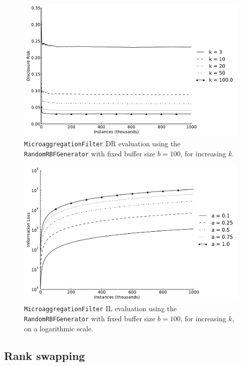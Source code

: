 \begin{figure}[h]
	\centering
	\includegraphics[width=0.9\linewidth]{figures/dr_ma-random.pdf}
	\caption[Microaggregation DR evaluation ($b = 100$).]{\texttt{MicroaggregationFilter} DR evaluation using the \texttt{RandomRBFGenerator} with fixed buffer size $b = 100$, for increasing $k$.}
	\label{fig:results-dr-ma}
\end{figure}

\begin{figure}[h]
	\centering
	\includegraphics[width=0.9\linewidth]{figures/il-log_na-random.pdf}
	\caption[Microaggregation IL evaluation ($b = 100$), logarithmic scale.]{\texttt{MicroaggregationFilter} IL evaluation using the \texttt{RandomRBFGenerator} with fixed buffer size $b = 100$, for increasing $k$, on a logarithmic scale.}
	\label{fig:results-il-log-ma}
\end{figure}

\subsection{Rank swapping}
\label{Benchmarking:Results:RankSwap}

